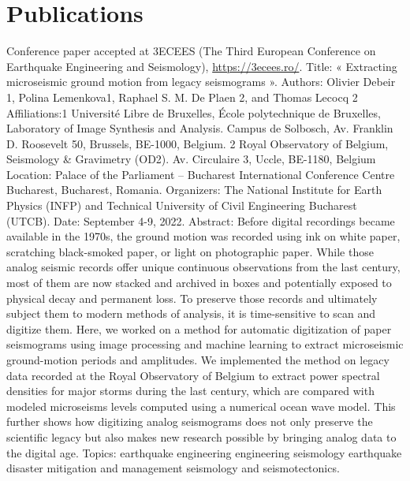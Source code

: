 \documentclass[a4paper,english,12pt]{article}
\begin{document}
\section{Publications}
Conference paper accepted at 3ECEES (The Third European Conference on Earthquake Engineering and Seismology), \href{https://3ecees.ro/}{https://3ecees.ro/}.
Title: « Extracting microseismic ground motion from legacy seismograms ».
Authors: Olivier Debeir 1, Polina Lemenkova1, Raphael S. M. De Plaen 2, and Thomas Lecocq 2 
Affiliations:1 Université Libre de Bruxelles, École polytechnique de Bruxelles, Laboratory of Image Synthesis and Analysis. Campus de Solbosch, Av. Franklin D. Roosevelt 50, Brussels, BE-1000, Belgium. 2 Royal Observatory of Belgium, Seismology \& Gravimetry (OD2). Av. Circulaire 3, Uccle, BE-1180, Belgium
Location: Palace of the Parliament -- Bucharest International Conference Centre Bucharest, Bucharest, Romania.   
Organizers: The National Institute for Earth Physics (INFP) and Technical University of Civil Engineering Bucharest (UTCB).
Date: September 4-9, 2022.                                
Abstract: Before digital recordings became available in the 1970s, the ground motion was recorded using ink on white paper, scratching black-smoked paper, or light on photographic paper. While those analog seismic records offer unique continuous observations from the last century, most of them are now stacked and archived in boxes and potentially exposed to physical decay and permanent loss. To preserve those records and ultimately subject them to modern methods of analysis, it is time-sensitive to scan and digitize them. Here, we worked on a method for automatic digitization of paper seismograms using image processing and machine learning to extract microseismic ground-motion periods and amplitudes. We implemented the method on legacy data recorded at the Royal Observatory of Belgium to extract power spectral densities for major storms during the last century, which are compared with modeled microseisms levels computed using a numerical ocean wave model. This further shows how digitizing analog seismograms does not only preserve the scientific legacy but also makes new research possible by bringing analog data to the digital age. Topics: earthquake engineering engineering seismology earthquake disaster mitigation and management seismology and seismotectonics.



\section*{}

\printbibliography
\end{document}
